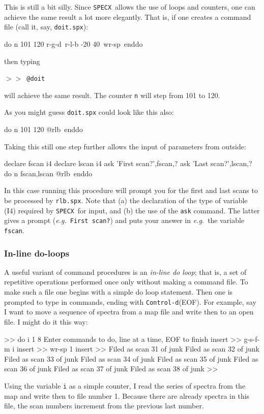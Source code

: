 \documentclass[11pt,twoside]{starlink}
\providecommand{\eg}{\textit{e.g.}}
\providecommand{\SPECX}{\texttt{SPECX}}
\providecommand{\SP}{{$>\!>$}}
\providecommand{\ctrld}{\texttt{Control-d}}
\begin{document}
This is still a bit silly. Since \SPECX\ allows the use of loops and
counters, one can achieve the same result a lot more elegantly. That
is, if one creates a command file (call it, say, \texttt{doit.spx}):

\begin{terminalv}
do n 101 120
r-g-d\n\
r-l-b -20 40\
wr-sp\1\
enddo
\end{terminalv}

then typing

\SP\ \verb|@doit|

will achieve the same result. The counter \texttt{n} will step from 101
to 120.

As you might guess \texttt{doit.spx} could look like this also:

\begin{terminalv}
do n 101 120
@rlb\n\
enddo
\end{terminalv}

Taking this still one step further allows the input of parameters from
outside:

\begin{terminalv}
declare fscan i4
declare lscan i4
ask 'First scan?',fscan,?
ask 'Last scan?',lscan,?
do n fscan,lscan
@rlb\n\
enddo
\end{terminalv}

In this case running this procedure will prompt you for the first and
last scans to be processed by \texttt{rlb.spx}. Note that (a) the
declaration of the type of variable (I4) required by \SPECX\ for
input, and (b) the use of the \texttt{ask} command. The latter gives a
prompt (\eg\ \texttt{First scan?}) and puts your answer in \eg\ the
variable \texttt{fscan}.

\subsubsection{In-line do-loops}
\label{sec:do-loops}
A useful variant of command procedures is an \textit{in-line do loop};
that is, a set of repetitive operations performed once only without
making a command file. To make such a file one begins with a simple do
loop statement. Then one is prompted to type in commands, ending with
\ctrld (EOF). For example, say I want to move a sequence of spectra
from a map file and write then to an open file. I might do it this
way:
\begin{terminalv}
>> do i 1 8
 Enter commands to do, line at a time, EOF to finish
 insert >> g-s-f-m i
 insert >> wr-sp 1
 insert >>
 Filed as scan  31 of junk
 Filed as scan  32 of junk
 Filed as scan  33 of junk
 Filed as scan  34 of junk
 Filed as scan  35 of junk
 Filed as scan  36 of junk
 Filed as scan  37 of junk
 Filed as scan  38 of junk
 >>
\end{terminalv}
Using the variable \texttt{i} as a simple counter, I read the series of
spectra from the map and write then to file number 1. Because there
are already spectra in this file, the scan numbers increment from the
previous last number.
\end{document}
